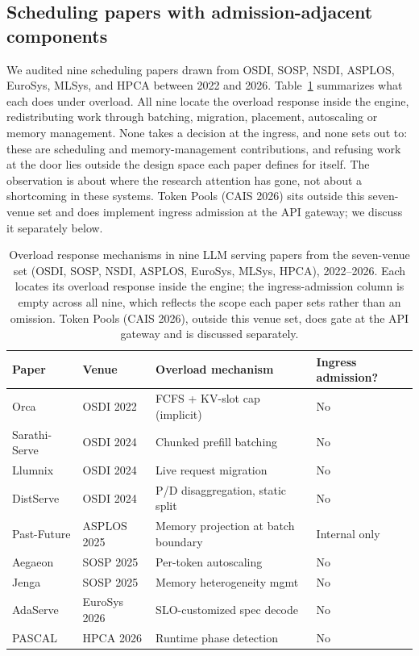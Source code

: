 \documentclass[10pt]{article} %
\theoremstyle{definition}
\begin{document}
\subsection{Scheduling papers with admission-adjacent components}

We audited nine scheduling papers drawn from OSDI, SOSP, NSDI,
ASPLOS, EuroSys, MLSys, and HPCA between 2022 and 2026.
Table~\ref{tab:9for9} summarizes what each does under overload. All
nine locate the overload response inside the engine, redistributing
work through batching, migration, placement, autoscaling or memory
management. None takes a decision at the ingress, and none sets out to:
these are scheduling and memory-management contributions, and refusing
work at the door lies outside the design space each paper defines for
itself. The observation is about where the research attention has gone,
not about a shortcoming in these systems. Token Pools (CAIS 2026) sits
outside this seven-venue set and does implement ingress admission at
the API gateway; we discuss it separately below.

\begin{table}[htbp]
\centering
\caption{Overload response mechanisms in nine LLM serving papers from the seven-venue set (OSDI, SOSP, NSDI, ASPLOS, EuroSys, MLSys, HPCA), 2022--2026. Each locates its overload response inside the engine; the ingress-admission column is empty across all nine, which reflects the scope each paper sets rather than an omission. Token Pools (CAIS 2026), outside this venue set, does gate at the API gateway and is discussed separately.}
\label{tab:9for9}
\small
{}
\begin{tabular}{l l l l}
\toprule
\rowcolor{admitteallight}
\textbf{Paper} & \textbf{Venue} & \textbf{Overload mechanism} & \textbf{Ingress admission?} \\
\midrule
Orca & OSDI 2022 & FCFS + KV-slot cap (implicit) & No \\
Sarathi-Serve & OSDI 2024 & Chunked prefill batching & No \\
Llumnix & OSDI 2024 & Live request migration & No \\
DistServe & OSDI 2024 & P/D disaggregation, static split & No \\
Past-Future \citep{pastfuture2025} & ASPLOS 2025 & Memory projection at batch boundary & Internal only \\
Aegaeon \citep{aegaeon2025} & SOSP 2025 & Per-token autoscaling & No \\
Jenga \citep{jenga2025} & SOSP 2025 & Memory heterogeneity mgmt & No \\
AdaServe \citep{adaserve2026} & EuroSys 2026 & SLO-customized spec decode & No \\
PASCAL \citep{pascal2026} & HPCA 2026 & Runtime phase detection & No \\
\bottomrule
\end{tabular}
\end{table}
\end{document}
